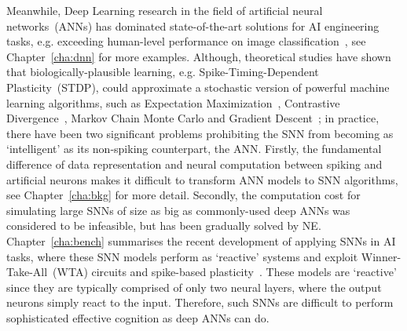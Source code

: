 Meanwhile, Deep Learning research in the field of artificial neural networks~(ANNs) has dominated state-of-the-art solutions for AI engineering tasks, e.g. exceeding human-level performance on image classification~\citep{he2015delving}, see Chapter~\ref{cha:dnn} for more examples.
Although, theoretical studies have shown that biologically-plausible learning, e.g. Spike-Timing-Dependent Plasticity~(STDP), could approximate a stochastic version of powerful machine learning algorithms, such as Expectation Maximization~\citep{nessler2013bayesian}, Contrastive Divergence~\citep{neftci2013event}, Markov Chain Monte Carlo \citep{buesing2011neural} and Gradient Descent~\citep{o2016deep};
in practice, there have been two significant problems prohibiting the SNN from becoming as `intelligent' as its non-spiking counterpart, the ANN.
Firstly, the fundamental difference of data representation and neural computation between spiking and artificial neurons makes it difficult to transform ANN models to SNN algorithms, see Chapter~\ref{cha:bkg} for more detail.
Secondly, the computation cost for simulating large SNNs of size as big as commonly-used deep ANNs was considered to be infeasible, but has been gradually solved by NE.
Chapter~\ref{cha:bench} summarises the recent development of applying SNNs in AI tasks, where these SNN models perform as `reactive' systems and exploit Winner-Take-All~(WTA) circuits and spike-based plasticity~\citep{bill2014compound,diehl2015unsupervised}.
These models are `reactive' since they are typically comprised of only two neural layers, where the output neurons simply react to the input.
Therefore, such SNNs are difficult to perform sophisticated effective cognition as deep ANNs can do.


%

